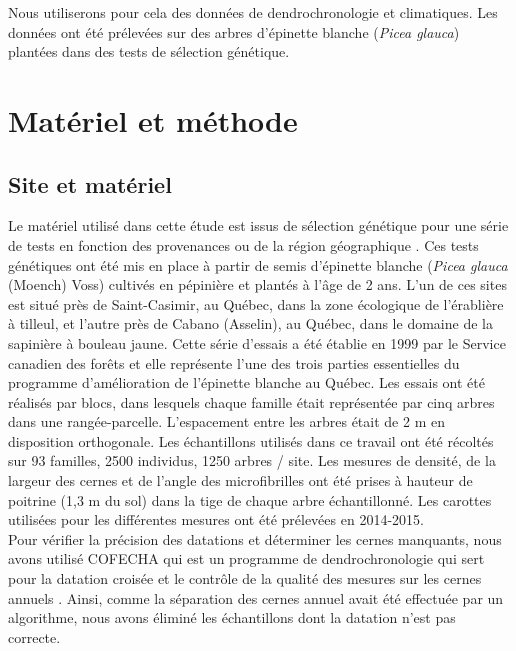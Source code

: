 \documentclass{report}
\begin{document}
 Nous utiliserons pour cela des données de dendrochronologie et climatiques. Les données ont été prélevées sur des arbres d'épinette blanche (\textit{Picea glauca}) plantées dans des tests de sélection génétique. 


\section*{Matériel et méthode}

\subsection*{Site et matériel}

Le matériel utilisé dans cette étude est issus de sélection génétique pour une série de tests %
 en fonction des provenances ou de la région géographique \citep{Beaulieu1996}. Ces tests génétiques ont été mis en place à partir de semis d'épinette blanche (\textit{Picea glauca} (Moench) Voss) cultivés en pépinière et plantés à l'âge de 2 ans. L'un de ces sites est situé près de Saint-Casimir, au Québec, dans la zone écologique de l'érablière à tilleul, et l'autre près de Cabano (Asselin), au Québec, dans le domaine de la sapinière à bouleau jaune. Cette série d'essais a été établie en 1999 par le Service canadien des forêts et elle représente l'une des trois parties essentielles du programme d'amélioration de l'épinette blanche au Québec. Les essais ont été réalisés par blocs, dans lesquels chaque famille était représentée par cinq arbres dans une rangée-parcelle. L'espacement entre les arbres était de 2 m en disposition orthogonale. Les échantillons utilisés dans ce travail ont été récoltés sur 93 familles, 2500 individus, 1250 arbres / site. Les mesures de densité, de la largeur des cernes et de l'angle des microfibrilles ont été prises à hauteur de poitrine (1,3 m du sol) dans la tige de chaque arbre échantillonné. Les carottes utilisées pour les différentes mesures ont été prélevées en 2014-2015.  \\ 

Pour vérifier la précision des datations et déterminer les cernes manquants,  nous avons utilisé COFECHA qui est un programme de dendrochronologie qui sert pour la datation croisée et le contrôle de la qualité des mesures sur les cernes annuels \citep{HOLMES1983}. Ainsi, comme la séparation des cernes annuel avait été effectuée par un algorithme, nous avons éliminé les échantillons dont la datation n'est pas correcte. 
\end{document}
